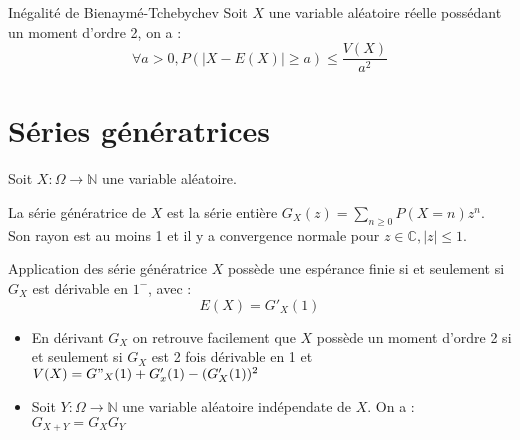 \documentclass[french, a4paper, 10pt, twocolumn]{article}
\newcommand{\N}{\mathbb{N}}   %
\newcommand{\C}{\mathbb{C}}   %
\begin{document}
\begin{theoreme}{Inégalité de Bienaymé-Tchebychev}
    Soit $X$ une variable aléatoire réelle possédant un moment d'ordre 2, on a :
     \[\forall a>0, P\left(|X-E(X)|\geqslant a\right)\leqslant \frac{V(X)}{a^2}\]
\end{theoreme}

\section*{Séries génératrices}

Soit \(X : \Omega \rightarrow \N\) une variable aléatoire.

\begin{definition}
    La série génératrice de \(X\) est la série entière \(G_X(z)=\sum_{n\geq 0}P(X=n)z^n\).
    Son rayon est au moins 1 et il y a convergence normale pour \(z \in \C, |z|\leq 1\).
\end{definition}

\begin{theoreme}{Application des série génératrice}
    \(X\) possède une espérance finie si et seulement si \(G_X\) est dérivable en \(1^-\), avec :
        \[E(X)=G'_X(1)\]

    \tcblower
    \begin{itemize}
        \item En dérivant \(G_X\) on retrouve facilement que \(X\) possède un moment d'ordre 2 si et seulement si \(G_X\) est
        2 fois dérivable en 1 et \(V(X)=G"_X(1)+G'_x(1)-(G'_X(1))^2\)
        \item Soit \(Y : \Omega \rightarrow \N\) une variable aléatoire indépendate de \(X\). On a : \(G_{X+Y}=G_X G_Y\)
    \end{itemize}
\end{theoreme}
\end{document}
